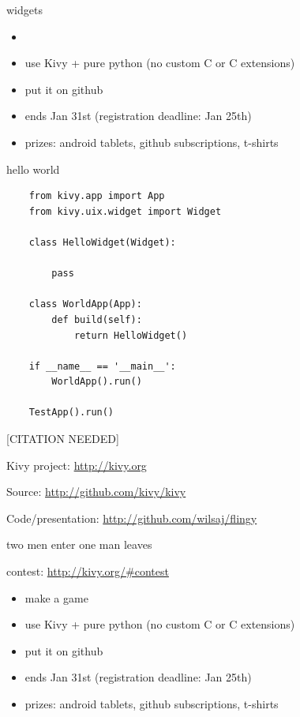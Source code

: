 \documentclass{beamer}
\begin{document}
\begin{frame}{widgets}

\begin{itemize}
  \item 
  \item use Kivy + pure python (no custom C or C extensions)
  \item put it on github
  \item ends Jan 31st (registration deadline: Jan 25th)
  \item prizes: android tablets, github subscriptions, t-shirts
\end{itemize}

\end{frame}



\begin{frame}[fragile]{hello world}
  \begin{verbatim}
    from kivy.app import App
    from kivy.uix.widget import Widget

    class HelloWidget(Widget):

        pass

    class WorldApp(App):
        def build(self):
            return HelloWidget()

    if __name__ == '__main__':
        WorldApp().run()

    TestApp().run()
  \end{verbatim}
\end{frame}



\begin{frame}{[CITATION NEEDED]}

Kivy project:  \url{http://kivy.org}

Source: \url{http://github.com/kivy/kivy}

Code/presentation: \url{http://github.com/wilsaj/flingy}

\end{frame}


\begin{frame}{two men enter one man leaves}

contest: \url{http://kivy.org/\#contest}

\begin{itemize}
  \item make a game
  \item use Kivy + pure python (no custom C or C extensions)
  \item put it on github
  \item ends Jan 31st (registration deadline: Jan 25th)
  \item prizes: android tablets, github subscriptions, t-shirts
\end{itemize}

\end{frame}
\end{document}

